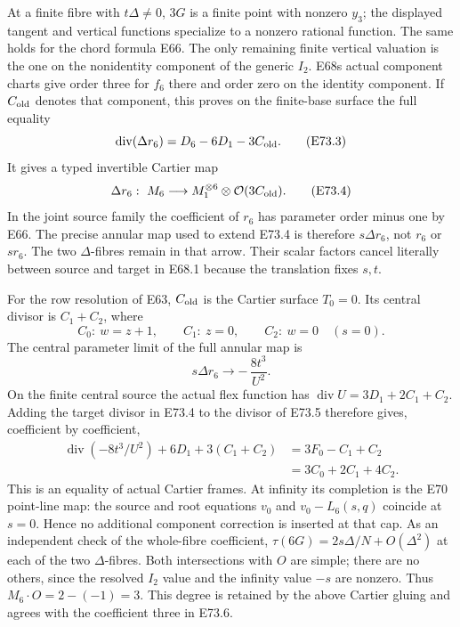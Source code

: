 At a finite fibre with \(t\Delta\ne0\), \(3G\) is a finite
point with nonzero \(y_3\); the displayed tangent and vertical
functions specialize to a nonzero rational function. The same
holds for the chord formula E66. The only remaining finite
vertical valuation is the one on the nonidentity component of
the generic \(I_2\). E68\textquotesingle s actual component charts give
order three for \(f_6\) there and order zero on the identity
component. If \(C_{\rm old}\) denotes that component, this proves
on the finite-base surface the full equality
\[
 \operatorname{div}(\Delta r_6)
       =D_6-6D_1-3C_{\rm old}.                  \tag{E73.3}
\]
It gives a typed invertible Cartier map
\[
 \Delta r_6:\ M_6\longrightarrow
             M_1^{\otimes6}\otimes\mathcal O(3C_{\rm old}).
 \tag{E73.4}
\]
In the joint source family the coefficient of \(r_6\) has
parameter order minus one by E66. The precise annular map used
to extend E73.4 is therefore \(s\Delta r_6\), not \(r_6\) or
\(sr_6\). The two \(\Delta\)-fibres remain in that arrow. Their
scalar factors cancel literally between source and target in
E68.1 because the translation fixes \(s,t\).

For the row resolution of E63, \(C_{\rm old}\) is the Cartier
surface \(T_0=0\). Its central divisor is \(C_1+C_2\), where
\[
 C_0:\ w=z+1,\qquad C_1:\ z=0,\qquad C_2:\ w=0
 \quad (s=0).
\]
The central parameter limit of the full annular map is
\[
                  s\Delta r_6\longrightarrow
                         -\,\frac{8t^3}{U^2}.   \tag{E73.5}
\]
On the finite central source the actual flex function has
\(\operatorname{div}U=3D_1+2C_1+C_2\).
Adding the target divisor in E73.4 to the divisor of E73.5
therefore gives, coefficient by coefficient,
\[
\begin{aligned}
 \operatorname{div}(-8t^3/U^2)
       +6D_1+3(C_1+C_2)
 &=3F_0-C_1+C_2\\
 &=3C_0+2C_1+4C_2.                              
\end{aligned} \tag{E73.6}
\]
This is an equality of actual Cartier frames. At infinity its
completion is the E70 point-line map: the source and root
equations \(v_0\) and \(v_0-L_6(s,q)\) coincide at \(s=0\).
Hence no additional component correction is inserted at that
cap. As an independent check of the whole-fibre coefficient,
\(\tau(6G)=2s\Delta/N+O(\Delta^2)\) at each of the two
\(\Delta\)-fibres. Both intersections with \(O\) are simple;
there are no others, since the resolved \(I_2\) value and the
infinity value \(-s\) are nonzero. Thus \(M_6\cdot O=2-(-1)=3\).
This degree is retained by the above Cartier gluing and agrees
with the coefficient three in E73.6.

